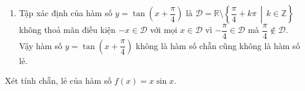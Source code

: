 \begin{bt}
{\begin{enumerate}
			Đặt $f(x)=|x|+\tan x$. Xét hai giá trị $\dfrac{\pi}{4}$ và $-\dfrac{\pi}{4}$ thuộc $\mathscr{D}$, ta có
			$$
			f\left(\dfrac{\pi}{4}\right)=\left|\dfrac{\pi}{4}\right|+\tan \dfrac{\pi}{4}=\dfrac{\pi}{4}+1 \text { và } f\left(-\dfrac{\pi}{4}\right)=\left|-\dfrac{\pi}{4}\right|+\tan \left(-\dfrac{\pi}{4}\right)=\dfrac{\pi}{4}-1.
			$$		
			Do $f\left(-\dfrac{\pi}{4}\right) \neq f\left(\dfrac{\pi}{4}\right)$ và $f\left(-\dfrac{\pi}{4}\right) \neq-f\left(\dfrac{\pi}{4}\right)$ nên $y=|x|+\tan x$ không là hàm số chẵn cũng không là hàm số lẻ.
			\item Tập xác định của hàm số $y=\tan \left(x+\dfrac{\pi}{4}\right)$ là $\mathscr{D}=\mathbb{R} \setminus \left\{\dfrac{\pi}{4}+k \pi \,\middle|\, k \in \mathbb{Z}\right\}$ không thoả mãn điều kiện $-x \in \mathscr{D}$ với mọi $x \in \mathscr{D}$ vì $-\dfrac{\pi}{4} \in \mathscr{D}$ mà $\dfrac{\pi}{4} \notin \mathscr{D}$.\\
			Vậy hàm số $y=\tan \left(x+\dfrac{\pi}{4}\right)$ không là hàm số chẵn cũng không là hàm số lẻ.
		\end{enumerate}
	}
\end{bt}

\begin{bt}%
Xét tính chẵn, lẻ của hàm số $f(x)=x \sin x$.
\end{bt}

